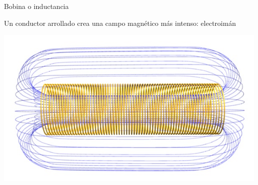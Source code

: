 \documentclass[aspectratio=169, xcolor={usenames,svgnames,dvipsnames}]{beamer}
\begin{document}
\begin{frame}{Bobina o inductancia}
\begin{minipage}[c]{0.47\linewidth}
        \vspace{3mm}
        Un \alert{conductor arrollado} crea una campo magnético más intenso: \alert{electroimán}
        \begin{center}
            \includegraphics[height=0.5\textheight]{../figs/Solenoide.jpg}
        \end{center}
    \end{minipage}
\end{frame}

\end{document}
